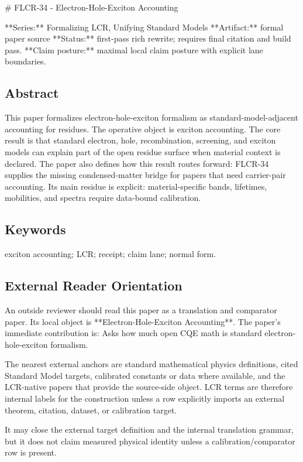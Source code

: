 \documentclass[11pt]{article}
\begin{document}
﻿\# FLCR-34 - Electron-Hole-Exciton Accounting

**Series:** Formalizing LCR, Unifying Standard Models
**Artifact:** formal paper source
**Status:** first-pass rich rewrite; requires final citation and build pass.
**Claim posture:** maximal local claim posture with explicit lane boundaries.

\subsection*{Abstract}

This paper formalizes electron-hole-exciton formalism as standard-model-adjacent accounting for residues. The operative object is exciton accounting. The core result is that standard electron, hole, recombination, screening, and exciton models can explain part of the open residue surface when material context is declared. The paper also defines how this result routes forward: FLCR-34 supplies the missing condensed-matter bridge for papers that need carrier-pair accounting. Its main residue is explicit: material-specific bands, lifetimes, mobilities, and spectra require data-bound calibration.

\subsection*{Keywords}

exciton accounting; LCR; receipt; claim lane; normal form.

\subsection*{External Reader Orientation}

An outside reviewer should read this paper as a translation and comparator paper. Its local object is **Electron-Hole-Exciton Accounting**. The paper's immediate contribution is: Asks how much open CQE math is standard electron-hole-exciton formalism.

The nearest external anchors are standard mathematical physics definitions, cited Standard Model targets, calibrated constants or data where available, and the LCR-native papers that provide the source-side object. LCR terms are therefore internal labels for the construction unless a row explicitly imports an external theorem, citation, dataset, or calibration target.

It may close the external target definition and the internal translation grammar, but it does not claim measured physical identity unless a calibration/comparator row is present.
\end{document}
